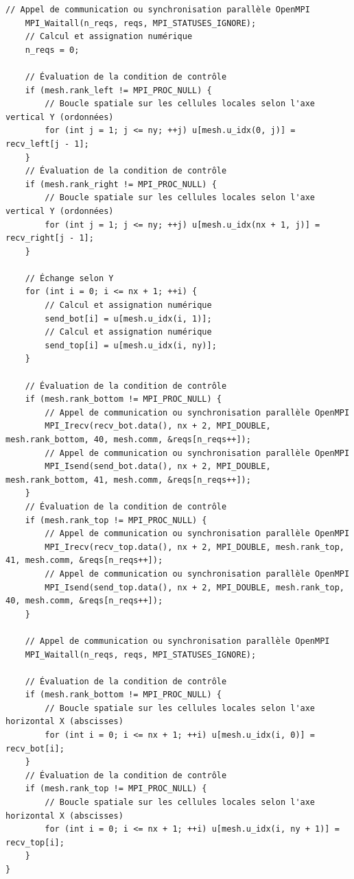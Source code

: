 \documentclass[10pt,a4paper,oneside]{book}
\begin{document}
\begin{lstlisting}[language={[11]C++}]
    // Appel de communication ou synchronisation parallèle OpenMPI
    MPI_Waitall(n_reqs, reqs, MPI_STATUSES_IGNORE);
    // Calcul et assignation numérique
    n_reqs = 0;

    // Évaluation de la condition de contrôle
    if (mesh.rank_left != MPI_PROC_NULL) {
        // Boucle spatiale sur les cellules locales selon l'axe vertical Y (ordonnées)
        for (int j = 1; j <= ny; ++j) u[mesh.u_idx(0, j)] = recv_left[j - 1];
    }
    // Évaluation de la condition de contrôle
    if (mesh.rank_right != MPI_PROC_NULL) {
        // Boucle spatiale sur les cellules locales selon l'axe vertical Y (ordonnées)
        for (int j = 1; j <= ny; ++j) u[mesh.u_idx(nx + 1, j)] = recv_right[j - 1];
    }

    // Échange selon Y
    for (int i = 0; i <= nx + 1; ++i) {
        // Calcul et assignation numérique
        send_bot[i] = u[mesh.u_idx(i, 1)];
        // Calcul et assignation numérique
        send_top[i] = u[mesh.u_idx(i, ny)];
    }

    // Évaluation de la condition de contrôle
    if (mesh.rank_bottom != MPI_PROC_NULL) {
        // Appel de communication ou synchronisation parallèle OpenMPI
        MPI_Irecv(recv_bot.data(), nx + 2, MPI_DOUBLE, mesh.rank_bottom, 40, mesh.comm, &reqs[n_reqs++]);
        // Appel de communication ou synchronisation parallèle OpenMPI
        MPI_Isend(send_bot.data(), nx + 2, MPI_DOUBLE, mesh.rank_bottom, 41, mesh.comm, &reqs[n_reqs++]);
    }
    // Évaluation de la condition de contrôle
    if (mesh.rank_top != MPI_PROC_NULL) {
        // Appel de communication ou synchronisation parallèle OpenMPI
        MPI_Irecv(recv_top.data(), nx + 2, MPI_DOUBLE, mesh.rank_top, 41, mesh.comm, &reqs[n_reqs++]);
        // Appel de communication ou synchronisation parallèle OpenMPI
        MPI_Isend(send_top.data(), nx + 2, MPI_DOUBLE, mesh.rank_top, 40, mesh.comm, &reqs[n_reqs++]);
    }

    // Appel de communication ou synchronisation parallèle OpenMPI
    MPI_Waitall(n_reqs, reqs, MPI_STATUSES_IGNORE);

    // Évaluation de la condition de contrôle
    if (mesh.rank_bottom != MPI_PROC_NULL) {
        // Boucle spatiale sur les cellules locales selon l'axe horizontal X (abscisses)
        for (int i = 0; i <= nx + 1; ++i) u[mesh.u_idx(i, 0)] = recv_bot[i];
    }
    // Évaluation de la condition de contrôle
    if (mesh.rank_top != MPI_PROC_NULL) {
        // Boucle spatiale sur les cellules locales selon l'axe horizontal X (abscisses)
        for (int i = 0; i <= nx + 1; ++i) u[mesh.u_idx(i, ny + 1)] = recv_top[i];
    }
}


\end{lstlisting}
\end{document}
